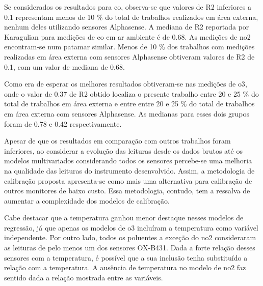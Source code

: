Se considerados os resultados para \acrshort{co}, observa-se que valores de R2 inferiores a 0.1 representam menos de 10 \% do total de trabalhos realizados em área externa, nenhum deles utilizando sensores Alphasense. A mediana de R2 reportada por Karagulian para medições de \acrshort{co} em ar ambiente é de 0.68. As medições de \acrshort{no2} encontram-se num patamar similar. Menos de 10 \% dos trabalhos com medições realizadas em área externa com sensores Alphasense obtiveram valores de R2 de 0.1, com um valor de mediana de 0.68.

Como era de esperar os melhores resultados obtiveram-se nas medições de \acrshort{o3}, onde o valor de 0.37 de R2 obtido localiza o presente trabalho entre 20 e 25 \% do total de trabalhos em área externa e entre entre 20 e 25 \% do total de trabalhos em área externa com sensores Alphasense. As medianas para esses dois grupos foram de 0.78 e 0.42 respectivamente.

Apesar de que os resultados em comparação com outros trabalhos foram inferiores, ao considerar a evolução das leituras desde os dados brutos até os modelos multivariados considerando todos os sensores percebe-se uma melhoria na qualidade das leituras do instrumento desenvolvido. Assim, a metodologia de calibração proposta apresenta-se como mais uma alternativa para calibração de outros monitores de baixo custo. Essa metodologia, contudo, tem a ressalva de aumentar a complexidade dos modelos de calibração.

Cabe destacar que a temperatura ganhou menor destaque nesses modelos de regressão, já que apenas os modelos de \acrshort{o3} incluíram a temperatura como variável independente. Por outro lado, todos os poluentes a exceção do \acrshort{no2} consideraram as leituras de pelo menos um dos sensores OX-B431. Dada a forte relação desses sensores com a temperatura, é possível que a sua inclusão tenha substituído a relação com a temperatura. A ausência de temperatura no modelo de \acrshort{no2} faz sentido dada a relação mostrada entre as variáveis.